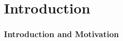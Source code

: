 \section{Introduction}
\frame{\tableofcontents[currentsection]}

\begin{frame} %
  \frametitle{Introduction and Motivation} %
\end{frame}

